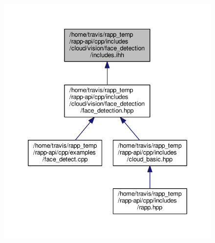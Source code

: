 \begin{figure}[H]
\begin{center}
\leavevmode
\includegraphics[width=335pt]{cloud_2vision_2face__detection_2includes_8ihh__dep__incl}
\end{center}
\end{figure}
